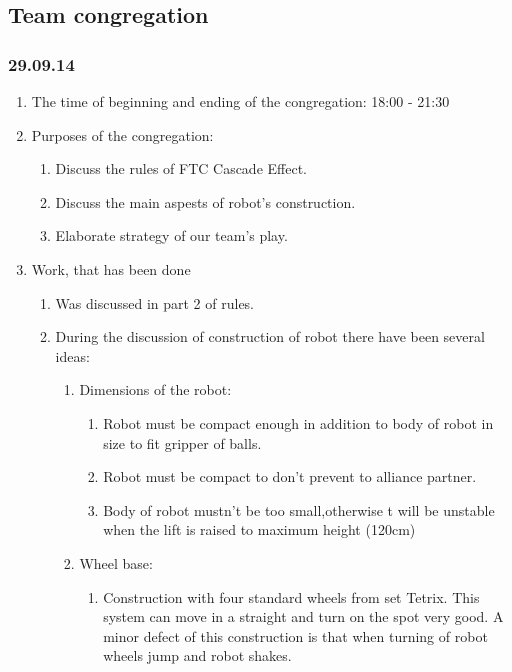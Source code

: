 \subsection{Team congregation}	
\subsubsection{29.09.14}

\begin{enumerate}
	\item The time of beginning and ending of the congregation: 18:00 - 21:30
	\item Purposes of the congregation:
	\begin{enumerate}
	  \item Discuss the rules of FTC Cascade Effect.
	  
	  \item Discuss the main aspests of robot's construction.
	  
      \item Elaborate strategy of our team's play. 
    \end{enumerate}
	\item Work, that has been done
	\begin{enumerate}
	  \item  Was discussed in part 2 of rules.
	  
	  \item During the discussion of construction of robot there have been several ideas: 
	  \begin{enumerate}
	    \item Dimensions of the robot:
	    \begin{enumerate}
	      \item Robot must be compact enough in addition to body of robot in size to fit gripper of  balls.
	      
	      \item Robot must be compact to don't prevent to alliance partner.
	      
	      \item Body of robot mustn't be too small,otherwise t will be unstable when the lift is raised to maximum height (120cm)
	      
	    \end{enumerate}
	    
	    \item Wheel base:
	    \begin{enumerate}
	      \item Construction with four standard wheels from set Tetrix. This system can move in a straight and turn on the spot very good. A minor defect of this construction is that when turning of robot wheels jump and robot shakes.  
	      

\end{enumerate}
\end{enumerate}
\end{enumerate}
\end{enumerate}
